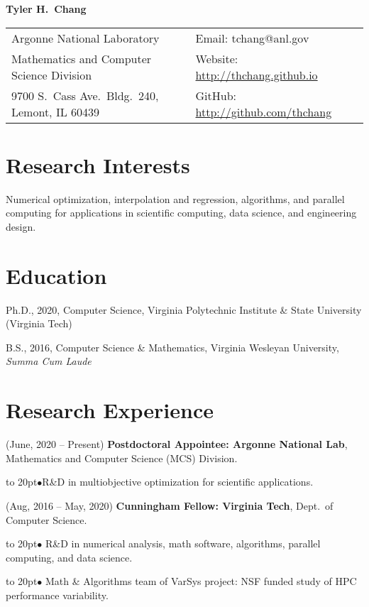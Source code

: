 \documentclass[12pt]{article}
\def\bullitem{\par\hangindent=15pt \hangafter=1
\noindent\hbox to 20pt{\hfil$\bullet$\hfil}\ignorespaces}
\begin{document}
{\Large \textbf{Tyler H.\ Chang}}

\begin{tabular}{ll}
   Argonne National Laboratory & Email: tchang@anl.gov\\
   Mathematics and Computer Science Division
      & Website: \url{http://thchang.github.io}\\
   9700 S.\ Cass Ave.\ Bldg.\ 240, Lemont, IL 60439
      & GitHub: \url{http://github.com/thchang} \\
\end{tabular}

\section*{Research Interests}

Numerical optimization, interpolation and regression, algorithms, and
parallel computing for applications in scientific computing,
data science, and engineering design.

\section*{Education}

Ph.D., 2020, Computer Science,
Virginia Polytechnic Institute \& State University
(Virginia Tech)

\medskip

B.S., 2016, Computer Science \& Mathematics,
Virginia Wesleyan University, \textit{Summa Cum Laude}

\section*{Research Experience}

\hangindent=0.3in
(June, 2020 -- Present)
\textbf{Postdoctoral Appointee: Argonne National Lab},
Mathematics and Computer Science (MCS) Division.
\bullitem R\&D in multiobjective optimization for scientific applications.

\medskip

\hangindent=0.3in
(Aug, 2016 -- May, 2020)
\textbf{Cunningham Fellow: Virginia Tech},
Dept.\ of Computer Science.
\bullitem
R\&D in numerical analysis, math software,
algorithms, parallel computing, and data science.
\bullitem
Math \& Algorithms team of VarSys project: NSF funded study of
HPC performance variability.

\medskip
\end{document}
